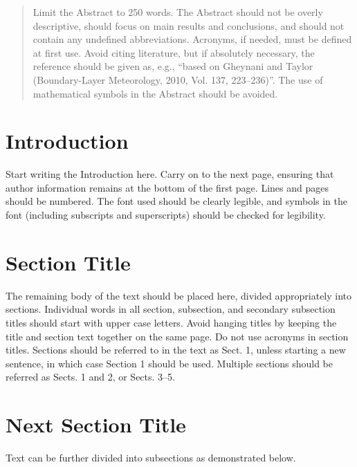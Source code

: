 \begin{abstract}Limit the Abstract to 250 words. The Abstract should not be overly descriptive, should focus on main results and conclusions, and should not contain any undefined abbreviations. Acronyms, if needed, must be defined at first use. Avoid citing literature, but if absolutely necessary, the reference should be given as, e.g., ``based on Gheynani and Taylor (Boundary-Layer Meteorology, 2010, Vol. 137, 223--236)''. The use of mathematical symbols in the Abstract should be avoided.
\end{abstract}

\section{Introduction}
\label{intro}
Start writing the Introduction here. Carry on to the next page, ensuring that author information remains at the bottom of the first page. Lines and pages should be numbered. The font used should be clearly legible, and symbols in the font (including subscripts and superscripts) should be checked for legibility.

\section{Section Title}
\label{sec:1}
The remaining body of the text should be placed here, divided appropriately into sections. Individual words in all section, subsection, and secondary subsection titles should start with upper case letters. Avoid hanging titles by keeping the title and section text together on the same page. Do not use acronyms in section titles. Sections should be referred to in the text as Sect. 1, unless starting a new sentence, in which case Section 1 should be used. Multiple sections should be referred as Sects. 1 and 2, or Sects. 3–5.

\section{Next Section Title}
Text can be further divided into subsections as demonstrated below.

